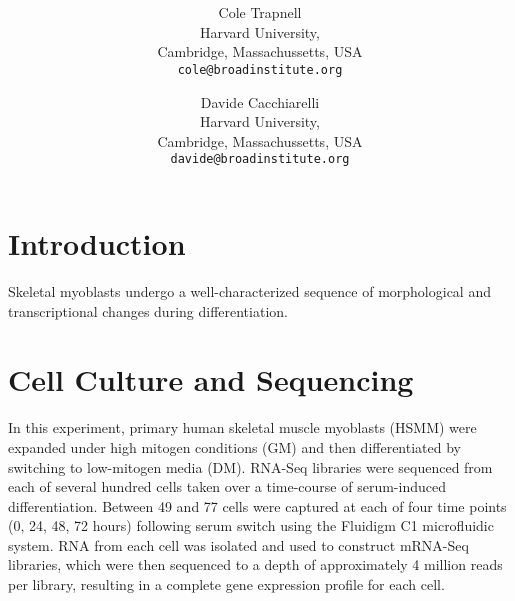 \documentclass[10pt,oneside]{article}\usepackage[]{graphicx}\usepackage[]{color}
\title{\textsf{\textbf{\thetitle}}}
\author{Cole Trapnell\\[1em]Harvard University,\\ Cambridge, Massachussetts, USA\\
\texttt{cole@broadinstitute.org} \and
Davide Cacchiarelli\\[1em]Harvard University,\\ Cambridge, Massachussetts, USA\\
\texttt{davide@broadinstitute.org}}
\begin{document}
\maketitle

\begin{abstract}
\end{abstract}

\tableofcontents




\section{Introduction}

Skeletal myoblasts undergo a well-characterized sequence of morphological and transcriptional changes during differentiation. 
\section{Cell Culture and Sequencing}

In this experiment, primary human skeletal muscle myoblasts (HSMM) were expanded under high mitogen conditions (GM) and then differentiated by switching to low-mitogen media (DM).  RNA-Seq libraries were sequenced from each of several hundred cells taken over a time-course of serum-induced differentiation. Between 49 and 77 cells were captured at each of four time points (0, 24, 48, 72 hours) following serum switch using the Fluidigm C1 microfluidic system. RNA from each cell was isolated and used to construct mRNA-Seq libraries, which were then sequenced to a depth of approximately 4 million reads per library, resulting in a complete gene expression profile for each cell. 
\end{document}
